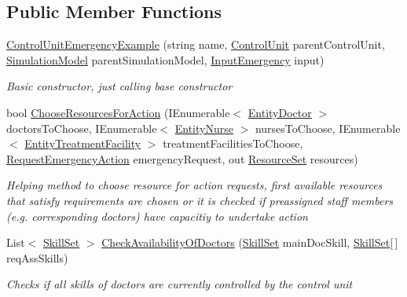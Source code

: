 \subsection*{Public Member Functions}
\begin{DoxyCompactItemize}
\item 
\hyperlink{class_sample_hospital_model_1_1_emergency_1_1_control_unit_emergency_example_a649b340cb6a59edd7ee4d22baa2f1d17}{Control\+Unit\+Emergency\+Example} (string name, \hyperlink{class_simulation_core_1_1_h_c_c_m_elements_1_1_control_unit}{Control\+Unit} parent\+Control\+Unit, \hyperlink{class_simulation_core_1_1_simulation_classes_1_1_simulation_model}{Simulation\+Model} parent\+Simulation\+Model, \hyperlink{class_sample_hospital_model_1_1_emergency_1_1_input_emergency}{Input\+Emergency} input)
\begin{DoxyCompactList}\small\item\em Basic constructor, just calling base constructor \end{DoxyCompactList}\item 
bool \hyperlink{class_sample_hospital_model_1_1_emergency_1_1_control_unit_emergency_example_abf35d1053d5acc5a4a225501a71dc037}{Choose\+Resources\+For\+Action} (I\+Enumerable$<$ \hyperlink{class_general_health_care_elements_1_1_entities_1_1_entity_doctor}{Entity\+Doctor} $>$ doctors\+To\+Choose, I\+Enumerable$<$ \hyperlink{class_general_health_care_elements_1_1_entities_1_1_entity_nurse}{Entity\+Nurse} $>$ nurses\+To\+Choose, I\+Enumerable$<$ \hyperlink{class_general_health_care_elements_1_1_entities_1_1_entity_treatment_facility}{Entity\+Treatment\+Facility} $>$ treatment\+Facilities\+To\+Choose, \hyperlink{class_general_health_care_elements_1_1_department_models_1_1_emergency_1_1_request_emergency_action}{Request\+Emergency\+Action} emergency\+Request, out \hyperlink{class_general_health_care_elements_1_1_resource_handling_1_1_resource_set}{Resource\+Set} resources)
\begin{DoxyCompactList}\small\item\em Helping method to choose resource for action requests, first available resources that satisfy requirements are chosen or it is checked if preassigned staff members (e.\+g. corresponding doctors) have capacitiy to undertake action \end{DoxyCompactList}\item 
List$<$ \hyperlink{class_simulation_core_1_1_h_c_c_m_elements_1_1_skill_set}{Skill\+Set} $>$ \hyperlink{class_sample_hospital_model_1_1_emergency_1_1_control_unit_emergency_example_ad2e25dbf2728729e6b97c60ce3d7b407}{Check\+Availability\+Of\+Doctors} (\hyperlink{class_simulation_core_1_1_h_c_c_m_elements_1_1_skill_set}{Skill\+Set} main\+Doc\+Skill, \hyperlink{class_simulation_core_1_1_h_c_c_m_elements_1_1_skill_set}{Skill\+Set}\mbox{[}$\,$\mbox{]} req\+Ass\+Skills)
\begin{DoxyCompactList}\small\item\em Checks if all skills of doctors are currently controlled by the control unit \end{DoxyCompactList}\end{DoxyCompactItemize}
